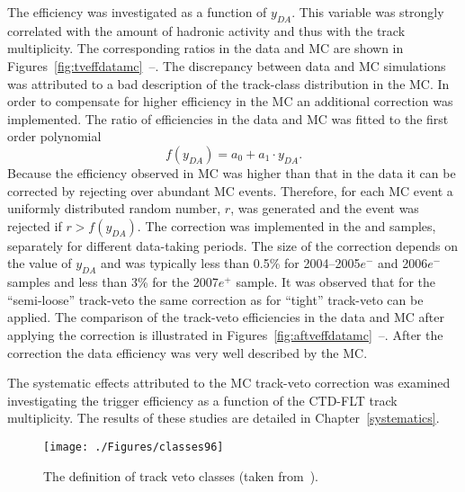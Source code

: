 The efficiency was investigated as a function of $y_{DA}$. This variable was strongly correlated with the amount of hadronic activity and thus with the track multiplicity. The corresponding ratios in the data and MC are shown in Figures~\ref{fig:tveffdatamc}~--. The discrepancy between data and MC simulations was attributed to a bad description of the track-class distribution in the MC. In order to compensate for higher efficiency in the MC an additional correction was implemented. The ratio of efficiencies in the data and MC was fitted to the first order polynomial
\begin{equation} 
 f\left(y_{DA}\right)=a_0 + a_1 \cdot y_{DA}.
\end{equation}
Because the efficiency observed in MC was higher than that in the data it can be corrected by rejecting over abundant MC events. Therefore, for each MC event a uniformly distributed random number, $r$, was generated and the event was rejected if $r > f\left(y_{DA}\right)$. The correction was implemented in the \lepto and \ariadne samples, separately for different data-taking periods. The size of the correction depends on the value of $y_{DA}$ and was typically less than 0.5\% for 2004--2005$e^-$ and 2006$e^-$ samples and less than 3\% for the 2007$e^+$ sample. It was observed that for the ``semi-loose'' track-veto the same correction as for ``tight'' track-veto can be applied. The comparison of the track-veto efficiencies in the data and MC after applying the correction is illustrated in Figures~\ref{fig:aftveffdatamc}~--. After the correction the data efficiency was very well described by the MC. 

The systematic effects attributed to the MC track-veto correction was examined investigating the trigger efficiency as a function of the CTD-FLT track multiplicity. The results of these studies are detailed in Chapter~\ref{systematics}.
\begin{figure}[t]
  \begin{center}
    \texttt{[image: ./Figures/classes96]}
  \end{center}
  \caption{The definition of track veto classes (taken from~\protect\cite{Yamazaki site}).}
  \label{fig:trackvetodefinition}
\end{figure}

